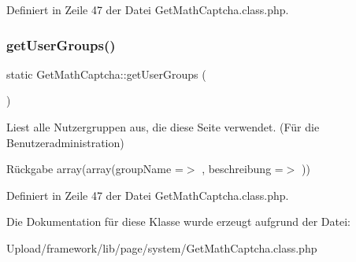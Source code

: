 Definiert in Zeile 47 der Datei Get\+Math\+Captcha.\+class.\+php.

\mbox{\label{class_get_math_captcha_ac6892757e363876674f9187917959bd7}} 
\subsubsection{\texorpdfstring{get\+User\+Groups()}{getUserGroups()}\hspace{0.1cm}{\footnotesize\ttfamily [2/2]}}
{\footnotesize\ttfamily static Get\+Math\+Captcha\+::get\+User\+Groups (\begin{DoxyParamCaption}{ }\end{DoxyParamCaption})\hspace{0.3cm}{\ttfamily [static]}}

Liest alle Nutzergruppen aus, die diese Seite verwendet. (Für die Benutzeradministration) \begin{DoxyReturn}{Rückgabe}
array(array(\textquotesingle{}group\+Name\textquotesingle{} =$>$ \textquotesingle{}\textquotesingle{}, \textquotesingle{}beschreibung\textquotesingle{} =$>$ \textquotesingle{}\textquotesingle{})) 
\end{DoxyReturn}


Definiert in Zeile 47 der Datei Get\+Math\+Captcha.\+class.\+php.



Die Dokumentation für diese Klasse wurde erzeugt aufgrund der Datei\+:\begin{DoxyCompactItemize}
\item 
Upload/framework/lib/page/system/Get\+Math\+Captcha.\+class.\+php\end{DoxyCompactItemize}
